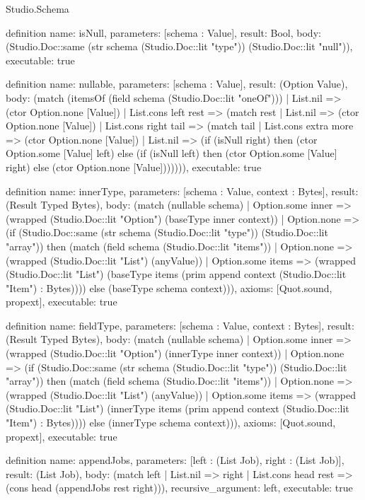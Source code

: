 \begin{lexlean}{Studio.Schema}
\begin{semanticmodule}
definition{
  name: isNull,
  parameters: [schema : Value],
  result: Bool,
  body: (Studio.Doc::same (str schema (Studio.Doc::lit "type")) (Studio.Doc::lit "null")),
  executable: true
}

definition{
  name: nullable,
  parameters: [schema : Value],
  result: (Option Value),
  body: (match (itemsOf (field schema (Studio.Doc::lit "oneOf")))
    | List.nil => (ctor Option.none [Value])
    | List.cons left rest => (match rest
      | List.nil => (ctor Option.none [Value])
      | List.cons right tail => (match tail
        | List.cons extra more => (ctor Option.none [Value])
        | List.nil => (if (isNull right) then (ctor Option.some [Value] left) else (if (isNull left) then (ctor Option.some [Value] right) else (ctor Option.none [Value])))))),
  executable: true
}

definition{
  name: innerType,
  parameters: [schema : Value, context : Bytes],
  result: (Result Typed Bytes),
  body: (match (nullable schema)
    | Option.some inner => (wrapped (Studio.Doc::lit "Option") (baseType inner context))
    | Option.none => (if (Studio.Doc::same (str schema (Studio.Doc::lit "type")) (Studio.Doc::lit "array")) then (match (field schema (Studio.Doc::lit "items"))
      | Option.none => (wrapped (Studio.Doc::lit "List") (anyValue))
      | Option.some items => (wrapped (Studio.Doc::lit "List") (baseType items (prim append context (Studio.Doc::lit "Item") : Bytes)))) else (baseType schema context))),
  axioms: [Quot.sound, propext],
  executable: true
}

definition{
  name: fieldType,
  parameters: [schema : Value, context : Bytes],
  result: (Result Typed Bytes),
  body: (match (nullable schema)
    | Option.some inner => (wrapped (Studio.Doc::lit "Option") (innerType inner context))
    | Option.none => (if (Studio.Doc::same (str schema (Studio.Doc::lit "type")) (Studio.Doc::lit "array")) then (match (field schema (Studio.Doc::lit "items"))
      | Option.none => (wrapped (Studio.Doc::lit "List") (anyValue))
      | Option.some items => (wrapped (Studio.Doc::lit "List") (innerType items (prim append context (Studio.Doc::lit "Item") : Bytes)))) else (innerType schema context))),
  axioms: [Quot.sound, propext],
  executable: true
}

definition{
  name: appendJobs,
  parameters: [left : (List Job), right : (List Job)],
  result: (List Job),
  body: (match left
    | List.nil => right
    | List.cons head rest => (cons head (appendJobs rest right))),
  recursive_argument: left,
  executable: true
}


\end{semanticmodule}
\end{lexlean}
